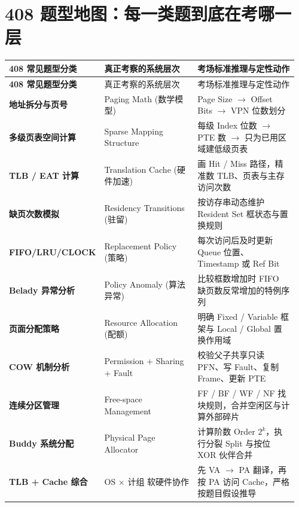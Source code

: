 \documentclass[11pt,a4paper]{ctexart}
\begin{document}
\section{408 题型地图：每一类题到底在考哪一层}
\begingroup
\small
\renewcommand{\arraystretch}{1.25}
\begin{longtable}{>{\bfseries}p{0.2\linewidth} p{0.36\linewidth} p{0.4\linewidth}}
\toprule
408 常见题型分类 & 真正考察的系统层次 & 考场标准推理与定性动作\\
\midrule
\endfirsthead
\toprule
408 常见题型分类 & 真正考察的系统层次 & 考场标准推理与定性动作\\
\midrule
\endhead
地址拆分与页号 & Paging Math (数学模型) & Page Size $\rightarrow$ Offset Bits $\rightarrow$ VPN 位数划分\\
多级页表空间计算 & Sparse Mapping Structure & 每级 Index 位数 $\rightarrow$ PTE 数 $\rightarrow$ 只为已用区域建低级页表\\
TLB / EAT 计算 & Translation Cache (硬件加速) & 画 Hit / Miss 路径，精准数 TLB、页表与主存访问次数\\
缺页次数模拟 & Residency Transitions (驻留) & 按访存串动态维护 Resident Set 框状态与置换规则\\
FIFO/LRU/CLOCK & Replacement Policy (策略) & 每次访问后及时更新 Queue 位置、Timestamp 或 Ref Bit\\
Belady 异常分析 & Policy Anomaly (算法异常) & 比较框数增加时 FIFO 缺页数反常增加的特例序列\\
页面分配策略 & Resource Allocation (配额) & 明确 Fixed / Variable 框架与 Local / Global 置换作用域\\
COW 机制分析 & Permission + Sharing + Fault & 校验父子共享只读 PFN、写 Fault、复制 Frame、更新 PTE\\
连续分区管理 & Free-space Management & FF / BF / WF / NF 找块规则，合并空闲区与计算外部碎片\\
Buddy 系统分配 & Physical Page Allocator & 计算阶数 Order $2^k$，执行分裂 Split 与按位 XOR 伙伴合并\\
TLB + Cache 综合 & OS × 计组 软硬件协作 & 先 VA $\rightarrow$ PA 翻译，再按 PA 访问 Cache，严格按题目假设推导\\
\bottomrule
\end{longtable}
\endgroup
\end{document}
